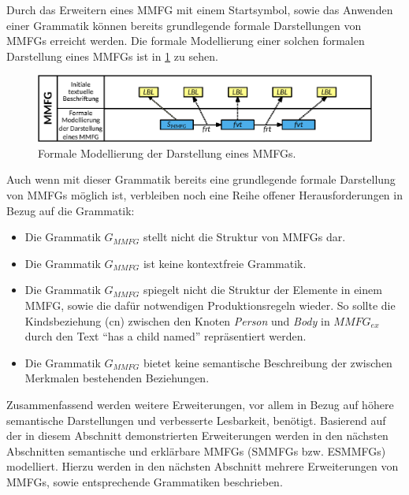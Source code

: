 Durch das Erweitern eines MMFG mit einem Startsymbol, sowie das Anwenden einer Grammatik können bereits grundlegende formale Darstellungen von MMFGs erreicht werden.
Die formale Modellierung einer solchen formalen Darstellung eines MMFGs ist in \cref{sec2:sota:subsec:fz-explainablity:fig:mmfg-formal-model} zu sehen.

%
\begin{figure}[htb]
    \centering
    \includegraphics[width=\textwidth]{chapter/chapter_2/mmfg/formal/formal-model-syntactic-mmfg.eps}
    \caption{Formale Modellierung der Darstellung eines MMFGs.}
    \label{sec2:sota:subsec:fz-explainablity:fig:mmfg-formal-model}
\end{figure}

Auch wenn mit dieser Grammatik bereits eine grundlegende formale Darstellung von MMFGs möglich ist, verbleiben noch eine Reihe offener Herausforderungen in Bezug auf die Grammatik:
\begin{itemize}
    \item Die Grammatik $G_{MMFG}$ stellt nicht die Struktur von MMFGs dar.
    \item Die Grammatik $G_{MMFG}$ ist keine kontextfreie Grammatik.
    \item Die Grammatik $G_{MMFG}$ spiegelt nicht die Struktur der Elemente in einem MMFG, sowie die dafür notwendigen Produktionsregeln wieder.
    So sollte die Kindsbeziehung (cn) zwischen den Knoten \textit{Person} und \textit{Body} in $MMFG_{ex}$ durch den Text \enquote{has a child named} repräsentiert werden.
    \item Die Grammatik $G_{MMFG}$ bietet keine semantische Beschreibung der zwischen Merkmalen bestehenden Beziehungen.
\end{itemize}
Zusammenfassend werden weitere Erweiterungen, vor allem in Bezug auf höhere semantische Darstellungen und verbesserte Lesbarkeit, benötigt.
Basierend auf der in diesem Abschnitt demonstrierten Erweiterungen werden in den nächsten Abschnitten semantische und erklärbare MMFGs (SMMFGs bzw. ESMMFGs) modelliert.
Hierzu werden in den nächsten Abschnitt mehrere Erweiterungen von MMFGs, sowie entsprechende Grammatiken beschrieben. 

